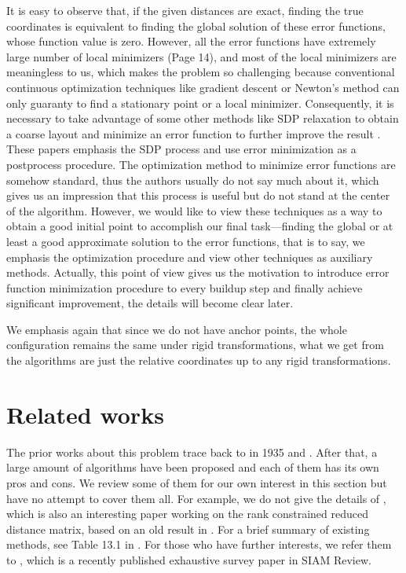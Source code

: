 \documentclass[a4paper,12pt]{article}
\begin{document}
It is easy to observe that, if the given distances are exact, finding the true coordinates is equivalent to finding the global solution of these error functions, whose function value is zero. However, all the error functions have extremely large number of local minimizers \cite{Nocedal1999} (Page 14), and most of the local minimizers are meaningless to us, which makes the problem so challenging because conventional continuous optimization techniques like gradient descent or Newton's method can only guaranty to find a stationary point or a local minimizer. Consequently, it is necessary to take advantage of some other methods like SDP relaxation to obtain a coarse layout and minimize an error function to further improve the result \cite{Biswas2008,Fang2013}. These papers emphasis the SDP process and use error minimization as a postprocess procedure. The optimization method to minimize error functions are somehow standard, thus the authors usually do not say much about it, which gives us an impression that this process is useful but do not stand at the center of the algorithm. However, we would like to view these techniques as a way to obtain a good initial point to accomplish our final task---finding the global or at least a good approximate solution to the error functions, that is to say, we emphasis the optimization procedure and view other techniques as auxiliary methods. Actually, this point of view gives us the motivation to introduce error function minimization procedure to every buildup step and finally achieve significant improvement, the details will become clear later.

We emphasis again that since we do not have anchor points, the whole configuration remains the same under rigid transformations, what we get from the algorithms are just the relative coordinates up to any rigid transformations.

 
\section{Related works}\label{sec:related}
The prior works about this problem trace back to \cite{Schoenberg1935} in 1935 and \cite{Blumenthal1953,Torgerson1958}. After that, a large amount of algorithms have been proposed and each of them has its own pros and cons. We review some of them for our own interest in this section but have no attempt to cover them all. For example, we do not give the details of \cite{Qi2012}, which is also an interesting paper working on the rank constrained reduced distance matrix, based on an old result in \cite{Schoenberg1935}. For a brief summary of existing methods, see Table 13.1 in \cite{Fang2013}. For those who have further interests, we refer them to \cite{Maculan2014}, which is a recently published exhaustive survey paper in SIAM Review.
\end{document}
